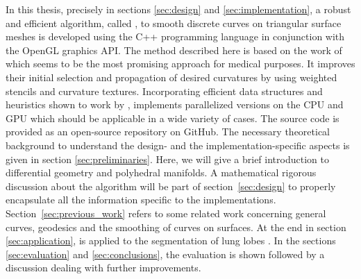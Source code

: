 \documentclass{stdlocal}
\begin{document}
In this thesis, precisely in sections \ref{sec:design} and \ref{sec:implementation}, a robust and efficient algorithm, called , to smooth discrete curves on triangular surface meshes is developed using the C++ programming language in conjunction with the OpenGL graphics API.
The method described here is based on the work of \textcite{lawonn2014} which seems to be the most promising approach for medical purposes.
It improves their initial selection and propagation of desired curvatures by using weighted stencils and curvature textures.
Incorporating efficient data structures and heuristics shown to work by \textcite{mancinelli2022},  implements parallelized versions on the CPU and GPU which should be applicable in a wide variety of cases.
The source code is provided as an open-source repository on GitHub.
The necessary theoretical background to understand the design- and the implementation-specific aspects is given in section \ref{sec:preliminaries}.
Here, we will give a brief introduction to differential geometry and polyhedral manifolds.
A mathematical rigorous discussion about the algorithm will be part of section~\ref{sec:design} to properly encapsulate all the information specific to the implementations.
Section~\ref{sec:previous_work} refers to some related work concerning general curves, geodesics and the smoothing of curves on surfaces.
At the end in section \ref{sec:application},  is applied to the segmentation of lung lobes \autocite{park2019}.
In the sections \ref{sec:evaluation} and \ref{sec:conclusions}, the evaluation is shown followed by a discussion dealing with further improvements.

\end{document}
